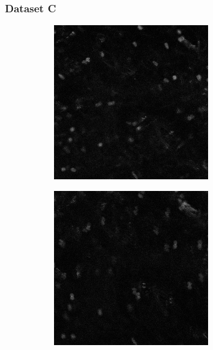 	\subsubsection{Dataset C}
    \begin{figure}[h]
    	\begin{subfigure}{.32\textwidth}
    		\includegraphics[width=\textwidth]{images/series13greencropped008}
    	\end{subfigure}
    	\hfill
    	\begin{subfigure}{.32\textwidth}
	    	\includegraphics[width=\textwidth]{images/series13greencropped009}

\end{subfigure}
\end{figure}
